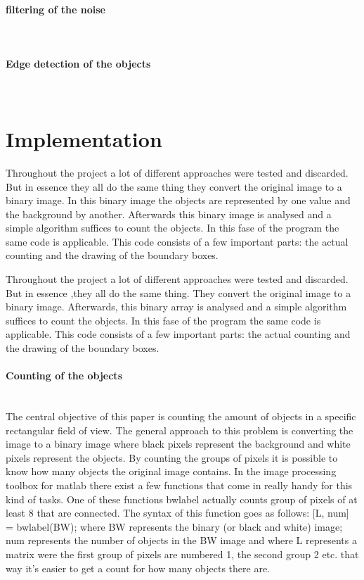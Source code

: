 \documentclass[11pt]{article}
\begin{document}
\paragraph{filtering of the noise}\mbox{}\\

\paragraph{Edge detection of the objects}\mbox{}\\

\section{Implementation}
Throughout the project a lot of different approaches were tested and discarded. But in essence they all do the same thing they convert the original image to a binary image. In this binary image the objects are represented by one value and the background by another. Afterwards this binary image is analysed and a simple algorithm suffices to count the objects. In this fase of the program the same code is applicable. This code consists of a few important parts: the actual counting and the drawing of the boundary boxes. 

Throughout the project a lot of different approaches were tested and discarded. But in essence ,they all do the same thing. They convert the original image to a binary image. Afterwards, this binary array is analysed and a simple algorithm suffices to count the objects. In this fase of the program the same code is applicable. This code consists of a few important parts: the actual counting and the drawing of the boundary boxes. 
\paragraph{Counting of the objects}\mbox{}\\
The central objective of this paper is counting the amount of objects in a specific rectangular field of view. The general approach to this problem is converting the image to a binary image where black pixels represent the background and white pixels represent the objects. By counting the groups of pixels it is possible to know how many objects the original image contains. In the image processing toolbox for matlab there exist a few functions that come in really handy for this kind of tasks. One of these functions bwlabel actually counts group of pixels of at least 8 that are connected. The syntax of this function goes as follows: [L, num] = bwlabel(BW); where BW represents the binary (or black and white) image; num represents the number of objects in the BW image and where L represents a matrix were the first group of pixels are numbered 1, the second group 2 etc. that way it's easier to get a count for how many objects there are.
\end{document}
